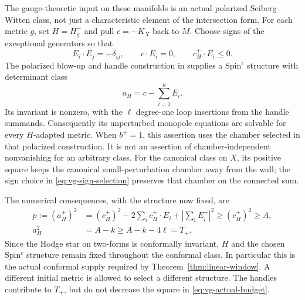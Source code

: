 The gauge-theoretic input on these manifolds is an actual polarized
Seiberg--Witten class, not just a characteristic element of the intersection
form.  For each metric $g$, set $H=H_g^+$ and pull
$c=-K_X$ back to $M$.  Choose signs of the exceptional generators so that
\begin{equation}\label{eq:vg-sign-selection}
 E_i\cdot E_j=-\delta_{ij},\qquad c\cdot E_i=0,
 \qquad c_H^+\cdot E_i\leq0.
\end{equation}
The polarized blow-up and handle construction in
\cite[Proposition~3.2 and its proof]{LeBrun2001} supplies a
Spin$^c$ structure with determinant class
\begin{equation}\label{eq:vg-actual-class}
 a_H=c-\sum_{i=1}^k E_i.
\end{equation}
Its invariant is nonzero, with the $\ell$ degree-one loop insertions from
the handle summands.  Consequently its unperturbed monopole equations
are solvable for every $H$-adapted metric.  When $b^+=1$, this assertion
uses the chamber selected in that polarized construction.  It is not an
assertion of chamber-independent nonvanishing for an arbitrary class.
For the canonical class on $X$, its positive square keeps the canonical
small-perturbation chamber away from the wall; the sign choice in
\eqref{eq:vg-sign-selection} preserves that chamber on the connected sum.

The numerical consequences, with the structure now fixed, are
\begin{equation}\label{eq:vg-actual-budget}
 \begin{split}
 p:=(a_H^+)^2
   &=(c_H^+)^2-2\sum_i c_H^+\cdot E_i
                        +\left|\sum_iE_i^+\right|^2
     \geq(c_H^+)^2\geq A,\\
 a_H^2&=A-k\geq A-k-4\ell=T_+.
 \end{split}
\end{equation}
Since the Hodge star on two-forms is conformally invariant, $H$ and the
chosen Spin$^c$ structure remain fixed throughout the conformal class.
In particular this is the actual conformal supply required by
Theorem~\ref{thm:linear-window}.  A different initial metric is allowed
to select a different structure.  The handles contribute to $T_+$, but
do not decrease the square in \eqref{eq:vg-actual-budget}.

